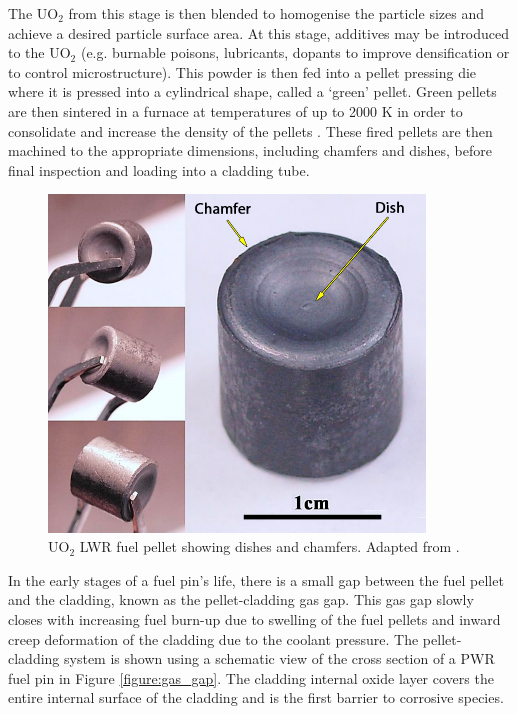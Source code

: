 The UO$_{2}$ from this stage is then blended to homogenise the particle sizes and achieve a desired particle surface area. At this stage, additives may be introduced to the UO$_{2}$ (e.g. burnable poisons, lubricants, dopants to improve densification or to control microstructure). This powder is then fed into a pellet pressing die where it is pressed into a cylindrical shape, called a `green' pellet. Green pellets are then sintered in a furnace at temperatures of up to 2000 K in order to consolidate and increase the density of the pellets \cite{pramanik2010innovative}. These fired pellets are then machined to the appropriate dimensions, including chamfers and dishes, before final inspection and loading into a cladding tube.

\begin{figure}[ht]
\centering
\includegraphics[width=10cm]{images/fuelpellet.png}
\caption[UO$_{2}$ LWR fuel pellet showing dishes and chamfers.]{UO$_{2}$ LWR fuel pellet showing dishes and chamfers. Adapted from \cite{tulenko2013development}.}
\label{figure:fuelpellet}
\end{figure}

In the early stages of a fuel pin's life, there is a small gap between the fuel pellet and the cladding, known as the pellet-cladding gas gap. This gas gap slowly closes with increasing fuel burn-up due to swelling of the fuel pellets and inward creep deformation of the cladding due to the coolant pressure. The pellet-cladding system is shown using a schematic view of the cross section of a PWR fuel pin in Figure \ref{figure:gas_gap}. The cladding internal oxide layer covers the entire internal surface of the cladding and is the first barrier to corrosive species. 

